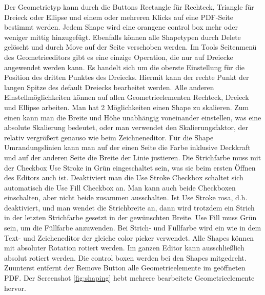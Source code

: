 Der Geometrietyp kann durch die Buttons Rectangle für Rechteck, Triangle für Dreieck oder Ellipse  und einem oder mehreren Klicks auf eine PDF-Seite bestimmt werden. Jedem Shape wird eine orangene control box mehr oder weniger mittig hinzugefügt. Ebenfalls können alle Shapetypen durch Delete gelöscht und durch Move auf der Seite verschoben werden. Im Tools Seitenmenü des Geometrieeditors gibt es eine einzige Operation, die nur auf Dreiecke angewendet werden kann. Es handelt sich um die oberste Einstellung für die Position des dritten Punktes des Dreiecks. Hiermit kann der rechte Punkt der langen Spitze des default Dreiecks bearbeitet werden. Alle anderen Einstellmöglichkeiten können auf allen Geometrieelementen Rechteck, Dreieck und Ellipse arbeiten. Man hat 2 Möglichkeiten einen Shape zu skalieren. Zum einen kann man die Breite und Höhe unabhängig voneinander einstellen, was eine absolute Skalierung bedeutet, oder man verwendet den Skalierungsfaktor, der relativ vergrößert genauso wie beim Zeichneneditor. Für die Shape Umrandungslinien kann man auf der einen Seite die Farbe inklusive Deckkraft und auf der anderen Seite die Breite der Linie justieren. Die Strichfarbe muss mit der Checkbox Use Stroke in Grün eingeschaltet sein, was sie beim ersten Öffnen des Editors auch ist. Deaktiviert man die Use Stroke Checkbox schaltet sich automatisch die Use Fill Checkbox an. Man kann auch beide Checkboxen einschalten, aber nicht beide zusammen ausschalten. Ist Use Stroke rosa, d.h. deaktiviert, und man wendet die Strichbreite an, dann wird trotzdem ein Strich in der letzten Strichfarbe gesetzt in der gewünschten Breite. Use Fill muss Grün sein, um die Füllfarbe anzuwenden. Bei Strich- und Füllfarbe wird ein wie in dem Text- und Zeicheneditor der gleiche color picker verwendet. Alle Shapes können mit absoluter Rotation rotiert werden. Im ganzen Editor kann ausschließlich absolut rotiert werden. Die control boxen werden bei den Shapes mitgedreht. Zuunterst entfernt der Remove Button alle Geometrieelemente im geöffneten PDF. Der Screenshot \ref{fig:shaping} hebt mehrere bearbeitete Geometrieelemente hervor.

